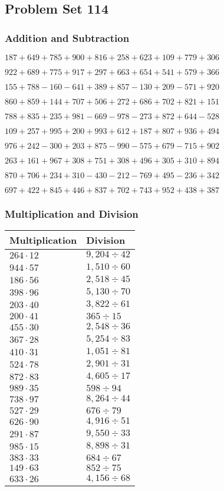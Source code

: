 \hypertarget{problem-set-114}{%
\subsection{Problem Set 114}\label{problem-set-114}}

\hypertarget{addition-and-subtraction}{%
\subsubsection{Addition and
Subtraction}\label{addition-and-subtraction}}

\(187 +649 +785 +900 +816 +258 +623 +109 +779 +306\)

\(922 +689 +775 +917 +297 +663 +654 +541 +579 +366\)

\(155 +788 - 160 - 641 +389 +857 - 130 +209 - 571 +920\)

\(860 +859 +144 +707 +506 +272 +686 +702 +821 +151\)

\(788 +835 +235 +981 - 669 - 978 - 273 +872 +644 - 528\)

\(109 +257 +995 +200 +993 +612 +187 +807 +936 +494\)

\(976 +242 - 300 +203 +875 - 990 - 575 +679 - 715 +902\)

\(263 +161 +967 +308 +751 +308 +496 +305 +310 +894\)

\(870 +706 +234 +310 - 430 - 212 - 769 +495 - 236 +342\)

\(697 +422 +845 +446 +837 +702 +743 +952 +438 +387\)

\hypertarget{multiplication-and-division}{%
\subsubsection{Multiplication and
Division}\label{multiplication-and-division}}

\begin{longtable}[]{@{}ll@{}}
\toprule
Multiplication & Division\tabularnewline
\midrule
\endhead
\(264 \cdot 12\) & \(9,204÷42\)\tabularnewline
\(944 \cdot 57\) & \(1,510÷60\)\tabularnewline
\(186 \cdot 56\) & \(2,518÷45\)\tabularnewline
\(398 \cdot 96\) & \(5,130÷70\)\tabularnewline
\(203 \cdot 40\) & \(3,822÷61\)\tabularnewline
\(200 \cdot 41\) & \(365÷15\)\tabularnewline
\(455 \cdot 30\) & \(2,548÷36\)\tabularnewline
\(367 \cdot 28\) & \(5,254÷83\)\tabularnewline
\(410 \cdot 31\) & \(1,051÷81\)\tabularnewline
\(524 \cdot 78\) & \(2,901÷31\)\tabularnewline
\(872 \cdot 83\) & \(4,605÷17\)\tabularnewline
\(989 \cdot 35\) & \(598÷94\)\tabularnewline
\(738 \cdot 97\) & \(8,264÷44\)\tabularnewline
\(527 \cdot 29\) & \(676÷79\)\tabularnewline
\(626 \cdot 90\) & \(4,916÷51\)\tabularnewline
\(291 \cdot 87\) & \(9,550÷33\)\tabularnewline
\(985 \cdot 15\) & \(8,898÷31\)\tabularnewline
\(383 \cdot 33\) & \(684÷67\)\tabularnewline
\(149 \cdot 63\) & \(852÷75\)\tabularnewline
\(633 \cdot 26\) & \(4,156÷68\)\tabularnewline
\bottomrule
\end{longtable}
